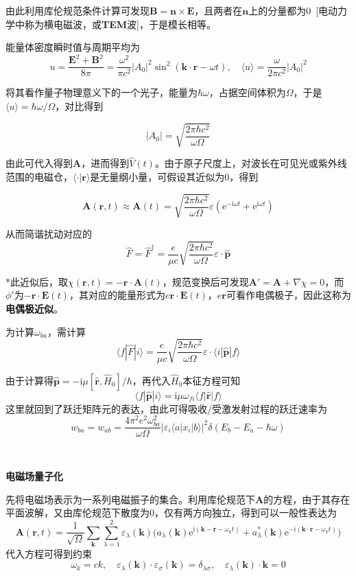 \documentclass[a4paper,UTF8,fontset=windows]{ctexart}
\newcommand*{\ir}{\mathrm{i}}
\newcommand*{\er}{\mathrm{e}}
\newcommand*{\bk}[2]{\langle#1|#2\rangle}
\newcommand*{\blk}[3]{\langle#1|#2|#3\rangle}
\newcommand*{\br}{\mathbf{r}}
\newcommand*{\bp}{\mathbf{p}}
\newcommand*{\ba}{\mathbf{A}}
\begin{document}
由此利用库伦规范条件计算可发现$\mathbf{B}=\mathbf{n}\times\mathbf{E}$，且两者在$\mathbf{n}$上的分量都为0\ [电动力学中称为横电磁波，或\textbf{TEM}波]，于是模长相等。

能量体密度瞬时值与周期平均为
$$u=\frac{\mathbf{E}^2+\mathbf{B}^2}{8\pi}=\frac{\omega^2}{\pi c^2}|A_0|^2\sin^2(\mathbf{k}\cdot\br-\omega t),\quad\langle u\rangle=\frac{\omega}{2\pi c^2}|A_0|^2$$

将其看作量子物理意义下的一个光子，能量为$\hbar\omega$，占据空间体积为$\Omega$，于是$\langle u\rangle=\hbar\omega/\Omega$，对比得到

$$|A_0|=\sqrt{\frac{2\pi\hbar c^2}{\omega\Omega}}$$

由此可代入得到$\ba$，进而得到$\hat{V}(t)$。由于原子尺度上，对波长在可见光或紫外线范围的电磁仓，$\bk\cdot\br$是无量纲小量，可假设其近似为0，得到

$$\ba(\br,t)\approx\ba(t)=\sqrt{\frac{2\pi\hbar c^2}{\omega\Omega}}\varepsilon(\er^{-\ir\omega t}+\er^{\ir\omega t})$$

从而简谐扰动对应的
$$\hat{F}=\hat{F}^\dagger=\frac{e}{\mu c}\sqrt{\frac{2\pi\hbar c^2}{\omega\Omega}}\varepsilon\cdot\hat{\bp}$$

*此近似后，取$\chi(\br,t)=-\br\cdot\ba(t)$，规范变换后可发现$\ba'=\ba+\nabla\chi=0$，而$\phi'$为$-\br\cdot\mathbf{E}(t)$，其对应的能量形式为$e\mathbf{r}\cdot\mathbf{E}(t)$，$e\mathbf{r}$可看作电偶极子，因此这称为\textbf{电偶极近似}。

为计算$\omega_{ba}$，需计算
$$\blk{f}{\hat{F}}{i}=\frac{e}{\mu c}\sqrt{\frac{2\pi\hbar c^2}{\omega\Omega}}\varepsilon\cdot\blk{i}{\hat{\bp}}{f}$$

由于计算得$\hat{\bp}=-\ir\mu[\hat{\br},\hat{H}_0]/\hbar$，再代入$\hat{H}_0$本征方程可知
$$\blk{f}{\hat{\bp}}{i}=\ir\mu\omega_{fi}\blk{f}{\hat{\br}}{f}$$
这里就回到了跃迁矩阵元的表达，由此可得吸收/受激发射过程的跃迁速率为
$$w_{ba}=w_{ab}=\frac{4\pi^2e^2\omega_{ba}^2}{\omega\Omega}|\varepsilon_i\blk{a}{x_i}{b}|^2\delta(E_b-E_a-\hbar\omega)$$

\

\textbf{电磁场量子化}

先将电磁场表示为一系列电磁振子的集合。利用库伦规范下$\ba$的方程，由于其存在平面波解，又由库伦规范下散度为0，仅有两方向独立，得到可以一般性表达为
$$\ba(\br,t)=\frac{1}{\sqrt{\Omega}}\sum_\mathbf{k}\sum_{\lambda=1}^2\varepsilon_\lambda(\mathbf{k})\big(a_\lambda(\mathbf{k})\er^{\ir(\mathbf{k}-\br-\omega_kt)}+a_\lambda^*(\mathbf{k})\er^{-\ir(\mathbf{k}\cdot\br-\omega_kt)}\big)$$
代入方程可得到约束
$$\omega_k=ck,\quad\varepsilon_\lambda(\mathbf{k})\cdot\varepsilon_\sigma(\mathbf{k})=\delta_{\lambda\sigma},\quad\varepsilon_\lambda(\mathbf{k})\cdot\mathbf{k}=0$$
\end{document}
